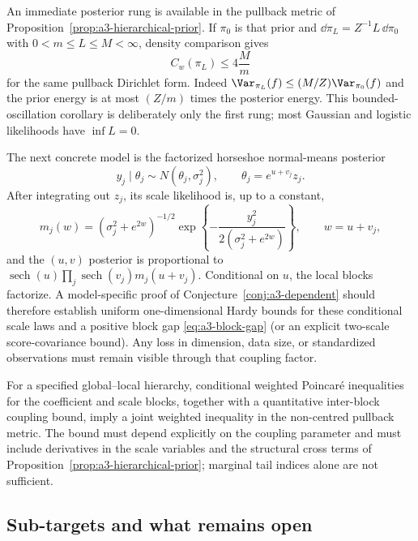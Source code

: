 \documentclass[../../main.tex]{subfiles}
\begin{document}
An immediate posterior rung is available in the pullback metric of
Proposition~\ref{prop:a3-hierarchical-prior}.  If $\pi_0$ is that prior and
$\dd\pi_L=Z^{-1}L\,\dd\pi_0$ with $0<m\le L\le M<\infty$, density comparison gives
\begin{equation}\label{eq:a3-bounded-likelihood}
 C_w(\pi_L)\le4\frac{M}{m}
\end{equation}
for the same pullback Dirichlet form.  Indeed
$\Var_{\pi_L}(f)\le(M/Z)\Var_{\pi_0}(f)$ and the prior energy is at most
$(Z/m)$ times the posterior energy.  This bounded-oscillation corollary is deliberately only the
first rung; most Gaussian and logistic likelihoods have $\inf L=0$.

The next concrete model is the factorized horseshoe normal-means posterior
\[
 y_j\mid\theta_j\sim N(\theta_j,\sigma_j^2),\qquad
 \theta_j=e^{u+v_j}z_j.
\]
After integrating out $z_j$, its scale likelihood is, up to a constant,
\[
 m_j(w)=(\sigma_j^2+e^{2w})^{-1/2}
 \exp\!\left\{-\frac{y_j^2}{2(\sigma_j^2+e^{2w})}\right\},
 \qquad w=u+v_j,
\]
and the $(u,v)$ posterior is proportional to
$\operatorname{sech}(u)\prod_j\operatorname{sech}(v_j)m_j(u+v_j)$.  Conditional on $u$, the local blocks factorize.  A
model-specific proof of Conjecture~\ref{conj:a3-dependent} should therefore establish uniform
one-dimensional Hardy bounds for these conditional scale laws and a positive block gap
\eqref{eq:a3-block-gap} (or an explicit two-scale score-covariance bound).  Any loss in dimension,
data size, or standardized observations must remain visible through that coupling factor.

\begin{conjecture}
\label{conj:a3-dependent}
For a specified global--local hierarchy, conditional weighted Poincar\'e inequalities for the
coefficient and scale blocks, together with a quantitative inter-block coupling bound, imply a
joint weighted inequality in the non-centred pullback metric. The bound must depend explicitly on
the coupling parameter and must include derivatives in the scale variables and the structural
cross terms of Proposition~\ref{prop:a3-hierarchical-prior}; marginal tail indices alone are not
sufficient.
\end{conjecture}

\subsection{Sub-targets and what remains open}
\label{subsec:a3-open}
\end{document}
